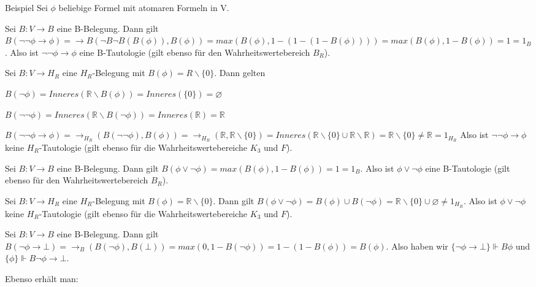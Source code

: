 \documentclass[a4paper]{article}
\begin{document}
\begin{multicols}{3}
  Beispiel
  Sei $\phi$ beliebige Formel mit atomaren Formeln in V.
  \begin{itemize*}
    \item Sei $B:V\rightarrow B$ eine B-Belegung. Dann gilt
    $B(\lnot\lnot\phi\rightarrow\phi) = \rightarrow B(\lnot B\lnot B(B(\phi)),B(\phi)) = max(B(\phi), 1 -( 1 -( 1 -B(\phi)))) = max(B(\phi), 1 -B(\phi)) = 1 = 1_B$.
    Also ist $\lnot\lnot\phi\rightarrow\phi$ eine B-Tautologie (gilt ebenso für den Wahrheitswertebereich $B_R$).
    \item Sei $B:V\rightarrow H_R$ eine $H_R$-Belegung mit $B(\phi) =R\backslash\{0\}$. Dann gelten
    \begin{itemize*}
      \item $B(\lnot\phi) = Inneres(\mathbb{R}\backslash B(\phi)) = Inneres(\{0\}) =\varnothing$
      \item $B(\lnot\lnot\phi) = Inneres(\mathbb{R}\backslash B(\lnot\phi)) = Inneres(\mathbb{R}) = \mathbb{R}$
      \item $B(\lnot\lnot\phi\rightarrow\phi) = \rightarrow_{H_R} (B(\lnot\lnot\phi),B(\phi)) = \rightarrow_{H_R} (\mathbb{R},\mathbb{R}\backslash \{0\}) = Inneres(\mathbb{R}\backslash\{0\}\cup\mathbb{R}\backslash\mathbb{R}) = \mathbb{R}\backslash\{0\}\not =\mathbb{R}= 1_{H_R}$
      Also ist $\lnot\lnot\phi\rightarrow\phi$ keine $H_R$-Tautologie (gilt ebenso für die Wahrheitswertebereiche $K_3$ und $F$).
    \end{itemize*}
    \item Sei $B:V\rightarrow B$ eine B-Belegung. Dann gilt $B(\phi\vee\lnot\phi) = max(B(\phi), 1 -B(\phi)) = 1 = 1_B$.
    Also ist $\phi\vee\lnot\phi$ eine B-Tautologie (gilt ebenso für den Wahrheitswertebereich $B_R$).
    \item Sei $B:V\rightarrow H_R$ eine $H_R$-Belegung mit $B(\phi)=\mathbb{R}\backslash\{0\}$. Dann gilt
    $B(\phi\vee\lnot\phi) = B(\phi)\cup B(\lnot\phi) = \mathbb{R}\backslash\{0\}\cup \varnothing \not= 1_{H_R}$.
    Also ist $\phi\vee\lnot\phi$ keine $H_R$-Tautologie (gilt ebenso für die Wahrheitswertebereiche $K_3$ und $F$).
    \item Sei $B:V\rightarrow B$ eine B-Belegung. Dann gilt
    $B(\lnot\phi\rightarrow\bot) = \rightarrow_B(B(\lnot\phi),B(\bot)) = max(0,1-B(\lnot \phi)) = 1 -( 1 -B(\phi)) =B(\phi)$.
    Also haben wir $\{\lnot\phi\rightarrow\bot\}\Vdash B\phi$ und $\{\phi\}\Vdash B\lnot \phi\rightarrow\bot$.
    \begin{itemize*}
      \item Ebenso erhält man:

\end{itemize*}
\end{itemize*}
\end{multicols}
\end{document}
